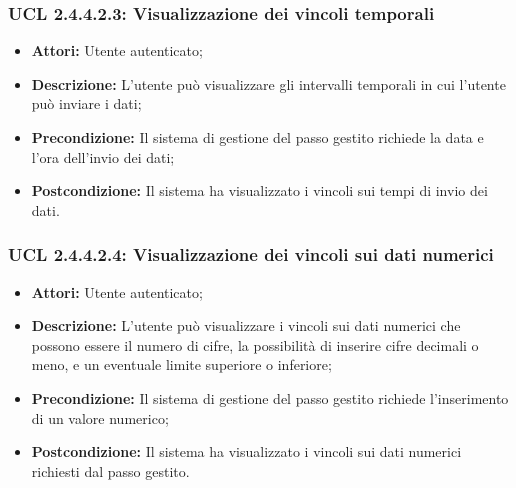 \hypertarget{L2.4.4.2.3}{}
\subsubsection{UCL 2.4.4.2.3: Visualizzazione dei vincoli temporali}
\begin{itemize}
\item \textbf{Attori:} Utente autenticato;
\item \textbf{Descrizione:} L'utente può visualizzare gli intervalli temporali in cui l'utente può inviare i dati;
\item \textbf{Precondizione:} Il sistema di gestione del passo gestito richiede la data e l'ora dell'invio dei dati;
\item \textbf{Postcondizione:} Il sistema ha visualizzato i vincoli sui tempi di invio dei dati.
\end{itemize}

\hypertarget{L2.4.4.2.4}{}
\subsubsection{UCL 2.4.4.2.4: Visualizzazione dei vincoli sui dati numerici}
\begin{itemize}
\item \textbf{Attori:} Utente autenticato;
\item \textbf{Descrizione:} L'utente può visualizzare i vincoli sui dati numerici che possono essere il numero di cifre, la possibilità di inserire cifre decimali o meno, e un eventuale limite superiore o inferiore;
\item \textbf{Precondizione:} Il sistema di gestione del passo gestito richiede l'inserimento di un valore numerico;
\item \textbf{Postcondizione:} Il sistema ha visualizzato i vincoli sui dati numerici richiesti dal passo gestito.
\end{itemize}

